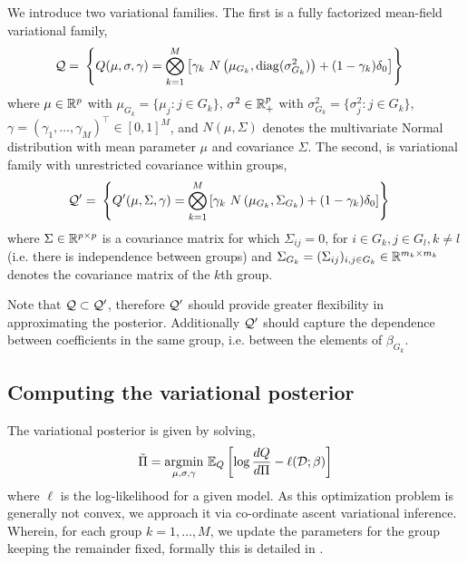 \documentclass[12pt]{article}
\begin{document}
We introduce two variational families. The first is a fully factorized mean-field variational family,
\begin{equation}
\begin{aligned}
    \mathcal{Q} = &\
    \left\{ Q(\mu, \sigma, \gamma) = 
	\bigotimes_{k=1}^M 
	\left[ 
	    \gamma_k\ N\left(\mu_{G_k}, \operatorname{diag}(\sigma_{G_k}^2) \right) + 
	    (1-\gamma_k) \delta_0
	\right] 
    \right\} 
\end{aligned}
\end{equation}
where $\mu \in \mathbb{R}^p$ with $\mu_{G_k} = \{ \mu_j : j \in G_k \}$, $\sigma^2 \in \mathbb{R}_+^p$ with $\sigma^2_{G_k} = \{\sigma^2_j : j \in G_k \}$, $ \gamma = (\gamma_1, \dots, \gamma_M)^\top \in [0, 1]^M $, 
and $N(\mu, \Sigma)$ denotes the multivariate Normal distribution with mean parameter $\mu$ and covariance $\Sigma$. The second, is variational family with unrestricted covariance within groups,
\begin{equation}
\begin{aligned}
    \mathcal{Q}' = &\
    \left\{ Q'(\mu, \Sigma, \gamma) = 
	\bigotimes_{k=1}^M 
	\left[ 
	    \gamma_k\ N\left(\mu_{G_k}, \Sigma_{G_k} \right) + 
	    (1-\gamma_k) \delta_0
	\right] 
    \right\} 
\end{aligned}
\end{equation}
where $\Sigma \in \mathbb{R}^{p \times p}$ is a covariance matrix for which $\Sigma_{ij} = 0$, for $i \in G_k, j \in G_l, k \neq l$ (i.e. there is independence between groups) and $\Sigma_{G_k} = (\Sigma_{ij})_{i, j \in G_k} \in \mathbb{R}^{m_k \times m_k}$ denotes the covariance matrix of the $k$th group. 

Note that $\mathcal{Q} \subset \mathcal{Q}'$, therefore $\mathcal{Q}'$ should provide greater flexibility in approximating the posterior. Additionally $\mathcal{Q}'$ should capture the dependence between coefficients in the same group, i.e. between the elements of $\beta_{G_k}$.

\subsection*{Computing the variational posterior}

The variational posterior is given by solving,
\begin{equation} \label{eq:opt} 
    \tilde{\Pi} = \underset{\mu, \sigma, \gamma}{{\arg\!\min}}\ \mathbb{E}_{Q} \left[ 
	\log \frac{dQ}{d\Pi} -\ell(\mathcal{D}; \beta) 
    \right]
\end{equation}
where $\ell$ is the log-likelihood for a given model. As this optimization problem is generally not convex, we approach it via co-ordinate ascent variational inference. Wherein, for each group $k=1,\dots,M$, we update the parameters for the group keeping the remainder fixed, formally this is detailed in .
\end{document}
